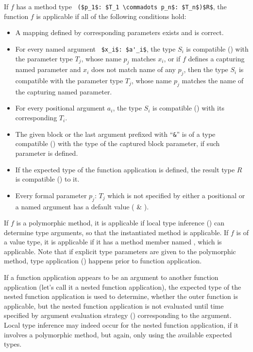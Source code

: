 If $f$ has a method type ~\lstinline!($p_1$: $T_1 \commadots p_n$: $T_n$)$R$!, the function $f$ is applicable if all of the following conditions hold:
\begin{itemize}

  \item A mapping defined by corresponding parameters exists and is correct. 

  \item For every named argument ~\lstinline!$x_i$: $a'_i$!, the type $S_i$ is compatible () with the parameter type $T_j$, whose name $p_j$ matches $x_i$, or if $f$ defines a capturing named parameter and $x_i$ does not match name of any $p_j$, then the type $S_i$ is compatible with the parameter type $T_j$, whose name $p_j$ matches the name of the capturing named parameter.

  \item For every positional argument $a_i$, the type $S_i$ is compatible () with its corresponding $T_i$. 

  \item The given block or the last argument prefixed with ``\lstinline!&!'' is of a type compatible () with the type of the captured block parameter, if such parameter is defined. 

  \item If the expected type of the function application is defined, the result type $R$ is compatible () to it. 

  \item Every formal parameter $p_j$: $T_j$ which is not specified by either a positional or a named argument has a default value ( \& ). 
  
\end{itemize}

If $f$ is a polymorphic method, it is applicable if local type inference () can determine type arguments, so that the instantiated method is applicable. If $f$ is of a value type, it is applicable if it has a method member named , which is applicable. Note that if explicit type parameters are given to the polymorphic method, type application () happens prior to function application. 

If a function application appears to be an argument to another function application (let's call it a nested function application), the expected type of the nested function application is used to determine, whether the outer function is applicable, but the nested function application is not evaluated until time specified by argument evaluation strategy () corresponding to the argument. Local type inference may indeed occur for the nested function application, if it involves a polymorphic method, but again, only using the available expected types. 


